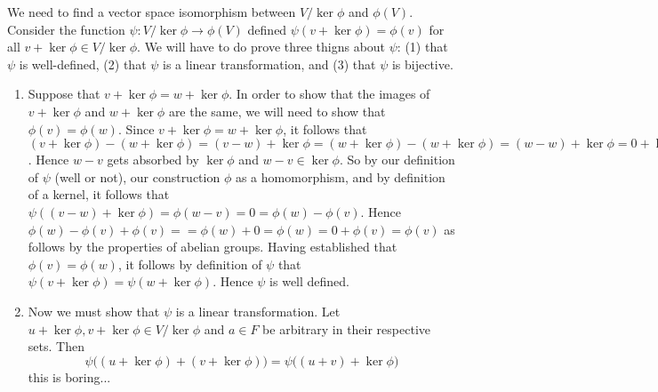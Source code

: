 \documentclass{article}
\begin{document}
 We need to find a vector space isomorphism between $V/\ker\phi$ and $\phi(V)$. Consider the function $\psi : V/\ker\phi \rightarrow \phi(V)$ defined $\psi(v + \ker\phi) = \phi(v)$ for all $v+ \ker\phi\in V/\ker\phi$. We will have to do prove three thigns about $\psi$: (1) that $\psi $ is well-defined, (2) that $\psi$ is a linear transformation, and (3) that $\psi$ is bijective.
\begin{enumerate}
    \item Suppose that $v+ \ker\phi = w + \ker\phi$. In order to show that the images of $v+ \ker\phi$ and $w+ \ker\phi$ are the same, we will need to show that $\phi(v) = \phi(w)$. Since $v + \ker\phi = w + \ker\phi$, it follows that $(v + \ker\phi) - (w + \ker\phi) = (v- w) + \ker\phi =  (w + \ker\phi) - (w + \ker\phi) = (w- w) + \ker\phi = 0+ \ker\phi$. Hence $ w - v $ gets absorbed by $\ker\phi$ and $w- v\in \ker\phi$. So by our definition of $\psi$ (well or not), our construction $\phi$ as a homomorphism, and by definition of a kernel, it follows that $\psi((v- w) + \ker\phi) = \phi(w-v) = 0 =  \phi(w) - \phi(v)$. Hence $\phi(w) - \phi(v)  + \phi(v) = = \phi(w) + 0 = \phi(w) =  0 + \phi(v)  = \phi(v)$ as follows by the properties of abelian groups. Having established that $\phi(v) = \phi(w)$, it follows by definition of $\psi$ that $\psi(v + \ker\phi) = \psi(w +\ker\phi)$. Hence $\psi$ is well defined.
    \item Now we must show that $\psi$ is a linear transformation. Let $u + \ker\phi,v + \ker\phi\in V/\ker\phi$ and $a\in F$ be arbitrary in their respective sets. Then
    $$\psi\big((u + \ker\phi) + (v + \ker\phi)\big) = \psi\big( (u + v) + \ker\phi \big)$$this is boring...
\end{enumerate}

\newpage
\end{document}
